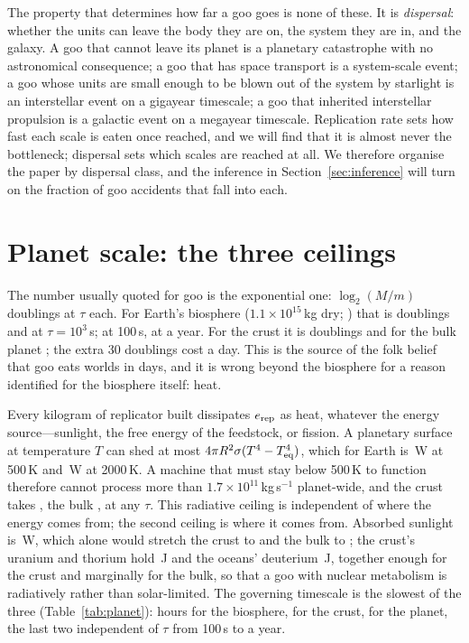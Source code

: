 \documentclass[11pt]{article}
\begin{document}
The property that determines how far a goo goes is none of these.  It is
\emph{dispersal}: whether the units can leave the body they are on, the system
they are in, and the galaxy.  A goo that cannot leave its planet is a
planetary catastrophe with no astronomical consequence; a goo that has space
transport is a system-scale event; a goo whose units are small enough to be
blown out of the system by starlight is an interstellar event on a gigayear
timescale; a goo that inherited interstellar propulsion is a galactic event on
a megayear timescale.  Replication rate sets how fast each scale is eaten once
reached, and we will find that it is almost never the bottleneck; dispersal
sets which scales are reached at all.  We therefore organise the paper by
dispersal class, and the inference in Section~\ref{sec:inference} will turn on
the fraction of goo accidents that fall into each.

\section{Planet scale: the three ceilings}
\label{sec:planet}

The number usually quoted for goo is the exponential one: $\log_2(M/m)$
doublings at $\tau$ each.  For Earth's biosphere ($1.1\times10^{15}$\,kg dry;
\citealt{BarOn2018}) that is \BioDoublings doublings and \BioExpTime at
$\tau=10^{3}$\,s; \BioExpTimeTauHundred at 100\,s, \BioExpTimeTauYear at a
year.  For the crust it is \CrustDoublings doublings and for the bulk planet
\BulkDoublings; the extra 30 doublings cost a day.  This is the source of the
folk belief that goo eats worlds in days, and it is wrong beyond the
biosphere for a reason \citet{Freitas2000} identified for the biosphere itself:
heat.

Every kilogram of replicator built dissipates $e_{\rm rep}$ as heat, whatever
the energy source---sunlight, the free energy of the feedstock, or fission.  A
planetary surface at temperature $T$ can shed at most
$4\pi R^{2}\sigma(T^{4}-T_{\rm eq}^{4})$, which for Earth is
\RadLimitFiveHundred\,W at 500\,K and \RadLimitTwoThousand\,W at 2000\,K.
A machine that must stay below 500\,K to function therefore cannot process
more than $1.7\times10^{11}$\,kg\,s$^{-1}$ planet-wide, and the crust takes
\CrustRadTime, the bulk \BulkRadTime, at any $\tau$.  This radiative ceiling is
independent of where the energy comes from; the second ceiling is where it
comes from.  Absorbed sunlight is \AbsorbedSolar\,W, which alone would
stretch the crust to \CrustSolarTime and the bulk to \BulkSolarTime; the
crust's uranium and thorium hold \CrustFissionJ\,J and the oceans' deuterium
\OceanDeuteriumJ\,J, together enough for the crust and marginally for the
bulk, so that a goo with nuclear metabolism is radiatively rather than
solar-limited.  The governing timescale is the slowest of the three
(Table~\ref{tab:planet}): hours for the biosphere, \CrustGovTime for the crust,
\BulkGovTime for the planet, the last two independent of $\tau$ from 100\,s
to a year.
\end{document}
